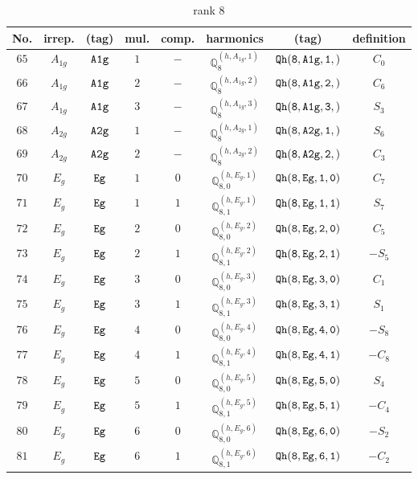 \documentclass[fleqn,8pt]{jsarticle}
\begin{document}
\begin{table}[ht!]
\begin{center}
\caption{rank 8}
\renewcommand{\arraystretch}{1.3}
\begin{tabular}{cccccccc} \hline \hline
No. & irrep. & (tag) & mul. & comp. & harmonics & (tag) & definition \\ \hline
$ 65 $ & $ A_{1g} $ & $ {\tt A1g} $ & $ 1 $ & $ - $ & $ \mathbb{Q}_{8}^{(h,A_{1g},1)} $ & $ {\tt Qh(8,A1g,1,)} $ & $ C_{0} $ \\
$ 66 $ & $ A_{1g} $ & $ {\tt A1g} $ & $ 2 $ & $ - $ & $ \mathbb{Q}_{8}^{(h,A_{1g},2)} $ & $ {\tt Qh(8,A1g,2,)} $ & $ C_{6} $ \\
$ 67 $ & $ A_{1g} $ & $ {\tt A1g} $ & $ 3 $ & $ - $ & $ \mathbb{Q}_{8}^{(h,A_{1g},3)} $ & $ {\tt Qh(8,A1g,3,)} $ & $ S_{3} $ \\
$ 68 $ & $ A_{2g} $ & $ {\tt A2g} $ & $ 1 $ & $ - $ & $ \mathbb{Q}_{8}^{(h,A_{2g},1)} $ & $ {\tt Qh(8,A2g,1,)} $ & $ S_{6} $ \\
$ 69 $ & $ A_{2g} $ & $ {\tt A2g} $ & $ 2 $ & $ - $ & $ \mathbb{Q}_{8}^{(h,A_{2g},2)} $ & $ {\tt Qh(8,A2g,2,)} $ & $ C_{3} $ \\
$ 70 $ & $ E_{g} $ & $ {\tt Eg} $ & $ 1 $ & $ 0 $ & $ \mathbb{Q}_{8,0}^{(h,E_{g},1)} $ & $ {\tt Qh(8,Eg,1,0)} $ & $ C_{7} $ \\
$ 71 $ & $ E_{g} $ & $ {\tt Eg} $ & $ 1 $ & $ 1 $ & $ \mathbb{Q}_{8,1}^{(h,E_{g},1)} $ & $ {\tt Qh(8,Eg,1,1)} $ & $ S_{7} $ \\
$ 72 $ & $ E_{g} $ & $ {\tt Eg} $ & $ 2 $ & $ 0 $ & $ \mathbb{Q}_{8,0}^{(h,E_{g},2)} $ & $ {\tt Qh(8,Eg,2,0)} $ & $ C_{5} $ \\
$ 73 $ & $ E_{g} $ & $ {\tt Eg} $ & $ 2 $ & $ 1 $ & $ \mathbb{Q}_{8,1}^{(h,E_{g},2)} $ & $ {\tt Qh(8,Eg,2,1)} $ & $ - S_{5} $ \\
$ 74 $ & $ E_{g} $ & $ {\tt Eg} $ & $ 3 $ & $ 0 $ & $ \mathbb{Q}_{8,0}^{(h,E_{g},3)} $ & $ {\tt Qh(8,Eg,3,0)} $ & $ C_{1} $ \\
$ 75 $ & $ E_{g} $ & $ {\tt Eg} $ & $ 3 $ & $ 1 $ & $ \mathbb{Q}_{8,1}^{(h,E_{g},3)} $ & $ {\tt Qh(8,Eg,3,1)} $ & $ S_{1} $ \\
$ 76 $ & $ E_{g} $ & $ {\tt Eg} $ & $ 4 $ & $ 0 $ & $ \mathbb{Q}_{8,0}^{(h,E_{g},4)} $ & $ {\tt Qh(8,Eg,4,0)} $ & $ - S_{8} $ \\
$ 77 $ & $ E_{g} $ & $ {\tt Eg} $ & $ 4 $ & $ 1 $ & $ \mathbb{Q}_{8,1}^{(h,E_{g},4)} $ & $ {\tt Qh(8,Eg,4,1)} $ & $ - C_{8} $ \\
$ 78 $ & $ E_{g} $ & $ {\tt Eg} $ & $ 5 $ & $ 0 $ & $ \mathbb{Q}_{8,0}^{(h,E_{g},5)} $ & $ {\tt Qh(8,Eg,5,0)} $ & $ S_{4} $ \\
$ 79 $ & $ E_{g} $ & $ {\tt Eg} $ & $ 5 $ & $ 1 $ & $ \mathbb{Q}_{8,1}^{(h,E_{g},5)} $ & $ {\tt Qh(8,Eg,5,1)} $ & $ - C_{4} $ \\
$ 80 $ & $ E_{g} $ & $ {\tt Eg} $ & $ 6 $ & $ 0 $ & $ \mathbb{Q}_{8,0}^{(h,E_{g},6)} $ & $ {\tt Qh(8,Eg,6,0)} $ & $ - S_{2} $ \\
$ 81 $ & $ E_{g} $ & $ {\tt Eg} $ & $ 6 $ & $ 1 $ & $ \mathbb{Q}_{8,1}^{(h,E_{g},6)} $ & $ {\tt Qh(8,Eg,6,1)} $ & $ - C_{2} $ \\
 \hline \hline
\end{tabular}
\end{center}
\end{table}
\end{document}
